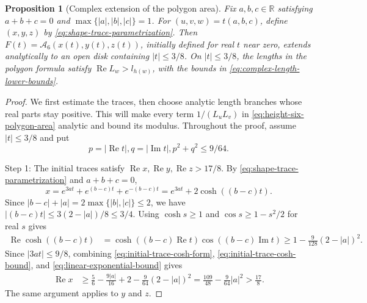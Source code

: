 \documentclass[10pt,twoside]{article}
\theoremstyle{plain}
\newtheorem{proposition}[theorem]{Proposition}
\theoremstyle{definition}
\theoremstyle{remark}
\newcommand{\A}{\mathcal A}
\begin{document}
\begin{proposition}[Complex extension of the polygon area]
\label{prop:complex-three-eighths}
Fix $a,b,c\in\mathbb R$ satisfying
$a+b+c=0$ and $\max\{|a|,|b|,|c|\}=1$.
For $(u,v,w)=t(a,b,c)$, define $(x,y,z)$ by
\eqref{eq:shape-trace-parametrization}. Then
$F(t)=\A_6(x(t),y(t),z(t))$, initially defined for real $t$ near zero,
extends analytically to an open disk containing $|t|\leq3/8$.
On $|t|\leq3/8$, the lengths in the polygon formula satisfy
$\operatorname{Re}L_w>l_{h(w)}$, with the bounds in
\eqref{eq:complex-length-lower-bounds}.
\end{proposition}

\begin{proof}
We first estimate the traces, then choose analytic length branches
whose real parts stay positive. This will make every term
$1/(L_uL_v)$ in \eqref{eq:height-six-polygon-area} analytic and
bound its modulus. Throughout the proof, assume $|t|\leq3/8$
and put
$$
p=|\operatorname{Re}t|,
q=|\operatorname{Im}t|,
p^2+q^2\leq9/64.
$$

Step 1: The initial traces satisfy
$\operatorname{Re}x,\operatorname{Re}y,\operatorname{Re}z>17/8$.
By \eqref{eq:shape-trace-parametrization} and $a+b+c=0$,
\begin{equation}
\label{eq:initial-trace-cosh-form}
x=e^{3at}+e^{(b-c)t}+e^{-(b-c)t}
=e^{3at}+2\cosh((b-c)t).
\end{equation}
Since $|b-c|+|a|=2\max\{|b|,|c|\}\leq2$,
we have $|(b-c)t|\leq3(2-|a|)/8\leq3/4$.
Using $\cosh s\geq1$ and $\cos s\geq1-s^2/2$ for real $s$ gives
\begin{equation}
\label{eq:initial-trace-cosh-bound}
\begin{aligned}
\operatorname{Re}\cosh((b-c)t)
&=\cosh((b-c)\operatorname{Re}t)
\cos((b-c)\operatorname{Im}t)\geq1-\frac9{128}(2-|a|)^2.
\end{aligned}
\end{equation}
Since $|3at|\leq9/8$, combining \eqref{eq:initial-trace-cosh-form},
\eqref{eq:initial-trace-cosh-bound}, and
\eqref{eq:linear-exponential-bound} gives
$$
\begin{aligned}
\operatorname{Re}x
&\geq\frac56-\frac{9|a|}{16}
+2-\frac9{64}(2-|a|)^2
=\frac{109}{48}-\frac9{64}|a|^2>\frac{17}{8}.
\end{aligned}
$$
The same argument applies to $y$ and $z$.


\end{proof}
\end{document}
